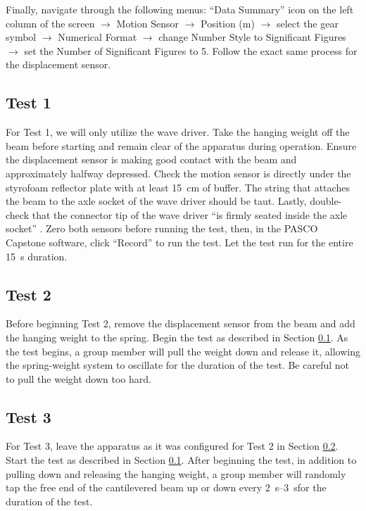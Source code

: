 \documentclass[12 pt]{report}
\begin{document}
Finally, navigate through the following menus: ``Data Summary'' icon on the left column of the screen $\rightarrow$ Motion Sensor $\rightarrow$ Position (m) $\rightarrow$ select the gear symbol $\rightarrow$ Numerical Format $\rightarrow$ change Number Style to Significant Figures $\rightarrow$ set the Number of Significant Figures to \num{5}. Follow the exact same process for the displacement sensor.

\subsection{Test 1} \label{procedures-test_1}
For Test \num{1}, we will only utilize the wave driver. Take the hanging weight off the beam before starting and remain clear of the apparatus during operation. Ensure the displacement sensor is making good contact with the beam and approximately halfway depressed. Check the motion sensor is directly under the styrofoam reflector plate with at least \qty{15}{\cm} of buffer. The string that attaches the beam to the axle socket of the wave driver should be taut. Lastly, double-check that the connector tip of the wave driver ``is firmly seated inside the axle socket'' \cite{lab_procedures}. Zero both sensors before running the test, then, in the PASCO Capstone software, click ``Record'' to run the test. Let the test run for the entire \qty{15}{\s} duration. 

\subsection{Test 2} \label{procedures-test_2}
Before beginning Test \num{2}, remove the displacement sensor from the beam and add the hanging weight to the spring. Begin the test as described in Section \ref{procedures-test_1}. As the test begins, a group member will pull the weight down and release it, allowing the spring-weight system to oscillate for the duration of the test. Be careful not to pull the weight down too hard.

\subsection{Test 3} \label{procedures-test_3}
For Test \num{3}, leave the apparatus as it was configured for Test \num{2} in Section \ref{procedures-test_2}. Start the test as described in Section \ref{procedures-test_1}. After beginning the test, in addition to pulling down and releasing the hanging weight, a group member will randomly tap the free end of the cantilevered beam up or down every \qtyrange{2}{3}{\s}for the duration of the test.
\end{document}

